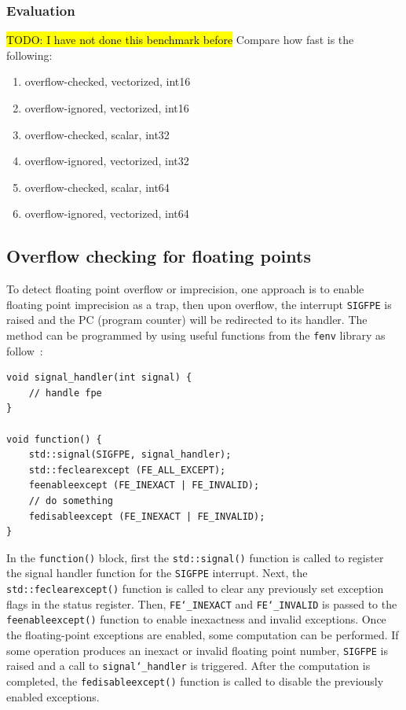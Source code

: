 \documentclass[logo,bsc,singlespacing,parskip]{infthesis}
\newcommand{\sigfpe}{\texttt{SIGFPE}}
\newcommand{\feinexact}{\texttt{FE\char`_INEXACT}}
\newcommand{\feinvalid}{\texttt{FE\char`_INVALID}}
\newenvironment{compactlist}
{ \begin{enumerate}
    \setlength{\itemsep}{0pt}
    \setlength{\parskip}{0pt}
    \setlength{\parsep}{0pt}     
}
{ \end{enumerate} }
\begin{document}
\subsubsection{Evaluation}
\hl{TODO: I have not done this benchmark before}
Compare how fast is the following:
\small

\begin{compactlist}
    \item overflow-checked, vectorized, int16
    \item overflow-ignored, vectorized, int16
    \item overflow-checked, scalar, int32
    \item overflow-ignored, vectorized, int32
    \item overflow-checked, scalar, int64
    \item overflow-ignored, vectorized, int64
\end{compactlist}
\normalsize

\subsection{Overflow checking for floating points}
\label{sec:overflow-float}
To detect floating point overflow or imprecision, one approach is to enable
floating point imprecision as a trap, then upon overflow, the interrupt \sigfpe{}
is raised and the PC (program counter) will be redirected to its handler. The
method can be programmed by using useful functions from the \texttt{fenv}
library as follow~\cite{fenvlib}:
\begin{verbatim}
void signal_handler(int signal) {
    // handle fpe
}

void function() {
    std::signal(SIGFPE, signal_handler);
    std::feclearexcept (FE_ALL_EXCEPT);
    feenableexcept (FE_INEXACT | FE_INVALID);
    // do something
    fedisableexcept (FE_INEXACT | FE_INVALID);
}
\end{verbatim}

In the \texttt{function()} block, first the \texttt{std::signal()} function is
called to register the signal handler function for the \sigfpe{} interrupt. Next,
the \texttt{std::feclearexcept()} function is called to clear any previously set
exception flags in the status register. Then, \feinexact{} and \feinvalid{} is
passed to the \texttt{feenableexcept()} function to enable inexactness and
invalid exceptions. Once the floating-point exceptions are enabled, some
computation can be performed. If some operation produces an inexact or invalid
floating point number, \sigfpe{} is raised and a call to
\texttt{signal\char`_handler} is triggered. After the computation is completed,
the \texttt{fedisableexcept()} function is called to disable the previously
enabled exceptions. 
\end{document}

